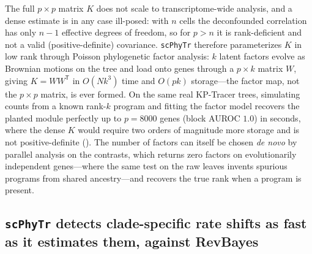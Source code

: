 \documentclass{article}
\newcommand{\scphytr}{\texttt{scPhyTr}}
\begin{document}
The full $p \times p$ matrix $K$ does not scale to transcriptome-wide analysis, and a dense
estimate is in any case ill-posed: with $n$ cells the deconfounded correlation has only
$n-1$ effective degrees of freedom, so for $p > n$ it is rank-deficient and not a valid
(positive-definite) covariance. \scphytr{} therefore parameterizes $K$ in low rank through
Poisson phylogenetic factor analysis: $k$ latent factors evolve as Brownian motions on the
tree and load onto genes through a $p \times k$ matrix $W$, giving $K = W W^{\mathsf{T}}$ in
$O(N k^3)$ time and $O(p k)$ storage---the factor map, not the $p \times p$ matrix, is ever
formed. On the same real KP-Tracer trees, simulating counts from a known rank-$k$ program and
fitting the factor model recovers the planted module perfectly up to $p = 8000$ genes (block
AUROC $1.0$) in seconds, where the dense $K$ would require two orders of magnitude more
storage and is not positive-definite (). The number of factors can itself be
chosen \emph{de novo} by parallel analysis on the contrasts, which returns zero factors on
evolutionarily independent genes---where the same test on the raw leaves invents spurious
programs from shared ancestry---and recovers the true rank when a program is present.

\subsection*{\scphytr{} detects clade-specific rate shifts as fast as it estimates them, against RevBayes}
\end{document}
